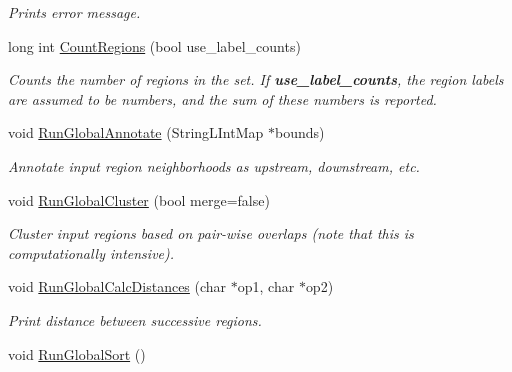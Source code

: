 \begin{DoxyCompactItemize}
\begin{DoxyCompactList}\small\item\em Prints error message. \end{DoxyCompactList}\item 
\hypertarget{classGenomicRegionSet_a260acb32612d31325099c9e53366c9d2}{
long int \hyperlink{classGenomicRegionSet_a260acb32612d31325099c9e53366c9d2}{CountRegions} (bool use\_\-label\_\-counts)}
\label{classGenomicRegionSet_a260acb32612d31325099c9e53366c9d2}

\begin{DoxyCompactList}\small\item\em Counts the number of regions in the set. If {\bfseries use\_\-label\_\-counts}, the region labels are assumed to be numbers, and the sum of these numbers is reported. \end{DoxyCompactList}\item 
\hypertarget{classGenomicRegionSet_a78c6f4879ac131e6db2094f21b466a98}{
void \hyperlink{classGenomicRegionSet_a78c6f4879ac131e6db2094f21b466a98}{RunGlobalAnnotate} (StringLIntMap $\ast$bounds)}
\label{classGenomicRegionSet_a78c6f4879ac131e6db2094f21b466a98}

\begin{DoxyCompactList}\small\item\em Annotate input region neighborhoods as upstream, downstream, etc. \end{DoxyCompactList}\item 
\hypertarget{classGenomicRegionSet_a619b51265f7bf5d6c92144de689ca8a2}{
void \hyperlink{classGenomicRegionSet_a619b51265f7bf5d6c92144de689ca8a2}{RunGlobalCluster} (bool merge=false)}
\label{classGenomicRegionSet_a619b51265f7bf5d6c92144de689ca8a2}

\begin{DoxyCompactList}\small\item\em Cluster input regions based on pair-\/wise overlaps (note that this is computationally intensive). \end{DoxyCompactList}\item 
\hypertarget{classGenomicRegionSet_a3d550572975732566378797ac1d8119b}{
void \hyperlink{classGenomicRegionSet_a3d550572975732566378797ac1d8119b}{RunGlobalCalcDistances} (char $\ast$op1, char $\ast$op2)}
\label{classGenomicRegionSet_a3d550572975732566378797ac1d8119b}

\begin{DoxyCompactList}\small\item\em Print distance between successive regions. \end{DoxyCompactList}\item 
\hypertarget{classGenomicRegionSet_a2d6dc99608a1d4938b421fa5a85f5477}{
void \hyperlink{classGenomicRegionSet_a2d6dc99608a1d4938b421fa5a85f5477}{RunGlobalSort} ()}
\label{classGenomicRegionSet_a2d6dc99608a1d4938b421fa5a85f5477}


\end{DoxyCompactItemize}
